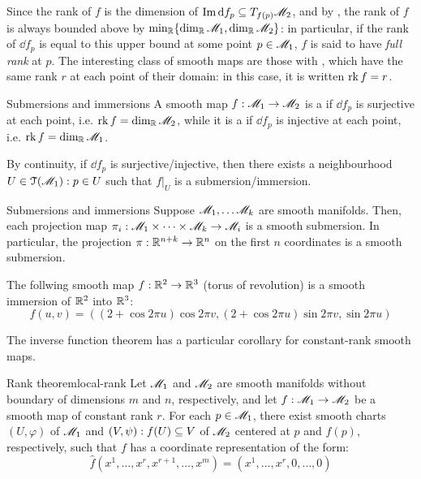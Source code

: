 Since the rank of $ f $ is the dimension of $ \operatorname{Im} \mathrm{d} f_p \subseteq T_{f(p)}\mathscr{M}_2 $, and by , the rank of $ f $ is always bounded above by $ \min_{\mathbb{R}} \{\dim_{\mathbb{R}} \mathscr{M}_1 , \dim_{\mathbb{R}} \mathscr{M}_2\} $: in particular, if the rank of $ \dd f_p $ is equal to this upper bound at some point $ p \in \mathscr{M}_1 $, $ f $ is said to have \emph{full rank} at $ p $. The interesting class of smooth maps are those with , which have the same rank $ r $ at each point of their domain: in this case, it is written $ \operatorname{rk} f = r $.

\begin{definition}{Submersions and immersions}{}
  A smooth map $ f : \mathscr{M}_1 \rightarrow \mathscr{M}_2 $ is a  if $ \dd f_p $ is surjective at each point, i.e. $ \operatorname{rk} f = \dim_{\mathbb{R}} \mathscr{M}_2 $, while it is a  if $ \dd f_p $ is injective at each point, i.e. $ \operatorname{rk} f = \dim_{\mathbb{R}} \mathscr{M}_1 $.
\end{definition}

By continuity, if $ \dd f_p $ is surjective/injective, then there exists a neighbourhood $ U \in \EuScript{T}(\mathscr{M}_1) : p \in U $ such that $ f \vert_U $ is a submersion/immersion.

\begin{example}{Submersions and immersions}
  Suppose $ \mathscr{M}_1 , \dots \mathscr{M}_k $ are smooth manifolds. Then, each projection map $ \pi_i : \mathscr{M}_1 \times \dots \times \mathscr{M}_k \rightarrow \mathscr{M}_i $ is a smooth submersion. In particular, the projection $ \pi : \mathbb{R}^{n+k} \rightarrow \mathbb{R}^n $ on the first $ n $ coordinates is a smooth submersion.

  The follwing smooth map $ f : \mathbb{R}^2 \rightarrow \mathbb{R}^3 $ (torus of revolution) is a smooth immersion of $ \mathbb{R}^2 $ into $ \mathbb{R}^3 $:
  \begin{equation*}
    f(u,v) = ((2 + \cos 2\pi u) \cos 2\pi v , (2 + \cos 2\pi u) \sin 2\pi v , \sin 2\pi u)
  \end{equation*}
\end{example}

The inverse function theorem has a particular corollary for constant-rank smooth maps.

\begin{theorem}{Rank theorem}{local-rank}
  Let $ \mathscr{M}_1 $ and $ \mathscr{M}_2 $ are smooth manifolds without boundary of dimensions $ m $ and $ n $, respectively, and let $ f : \mathscr{M}_1 \rightarrow \mathscr{M}_2 $ be a smooth map of constant rank $ r $. For each $ p \in \mathscr{M}_1 $, there exist smooth charts $ (U,\varphi) $ of $ \mathscr{M}_1 $ and $ (V,\psi) : f(U) \subseteq V $ of $ \mathscr{M}_2 $ centered at $ p $ and $ f(p) $, respectively, such that $ f $ has a coordinate representation of the form:
  \begin{equation}
    \hat{f}(x^1 , \dots , x^r , x^{r+1} , \dots , x^m) = (x^1 , \dots , x^r , 0 , \dots , 0)
    \label{eq:rank-canonical-form}
  \end{equation}
\end{theorem}

